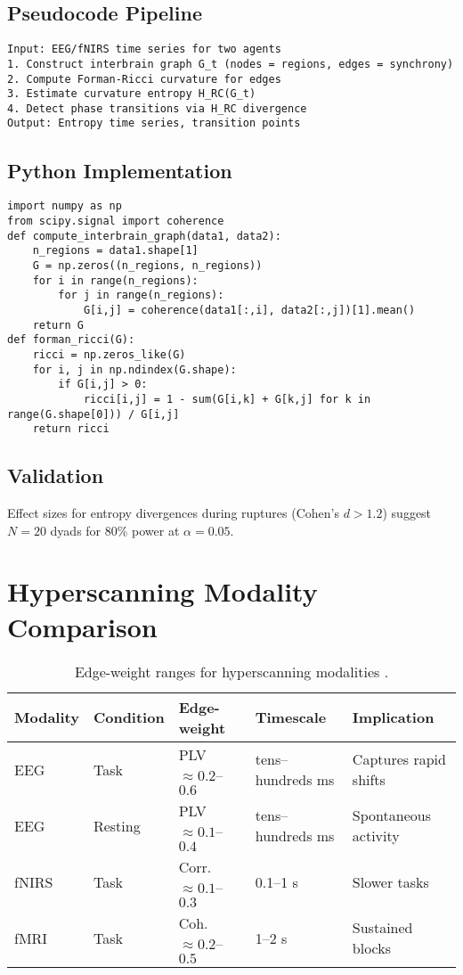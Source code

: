 \documentclass{article}
\theoremstyle{definition}
\begin{document}
\subsection{Pseudocode Pipeline}
\begin{verbatim}
Input: EEG/fNIRS time series for two agents
1. Construct interbrain graph G_t (nodes = regions, edges = synchrony)
2. Compute Forman-Ricci curvature for edges
3. Estimate curvature entropy H_RC(G_t)
4. Detect phase transitions via H_RC divergence
Output: Entropy time series, transition points
\end{verbatim}

\subsection{Python Implementation}
\begin{verbatim}
import numpy as np
from scipy.signal import coherence
def compute_interbrain_graph(data1, data2):
    n_regions = data1.shape[1]
    G = np.zeros((n_regions, n_regions))
    for i in range(n_regions):
        for j in range(n_regions):
            G[i,j] = coherence(data1[:,i], data2[:,j])[1].mean()
    return G
def forman_ricci(G):
    ricci = np.zeros_like(G)
    for i, j in np.ndindex(G.shape):
        if G[i,j] > 0:
            ricci[i,j] = 1 - sum(G[i,k] + G[k,j] for k in range(G.shape[0])) / G[i,j]
    return ricci
\end{verbatim}

\subsection{Validation}
Effect sizes for entropy divergences during ruptures (Cohen’s $d > 1.2$) suggest $N=20$ dyads for 80\% power at $\alpha=0.05$.

\section{Hyperscanning Modality Comparison}
\begin{table}[ht]
\centering
\caption{Edge-weight ranges for hyperscanning modalities \cite{hinrichs2025geometry}.}
\label{tab:modality-comparison}
\begin{tabularx}{\textwidth}{@{}p{1.5cm} p{1.8cm} p{2.5cm} p{2cm} X@{}}
\toprule
\textbf{Modality} & \textbf{Condition} & \textbf{Edge-weight} & \textbf{Timescale} & \textbf{Implication} \\
\midrule
EEG & Task & PLV $\approx 0.2$--$0.6$ & tens--hundreds ms & Captures rapid shifts \\
EEG & Resting & PLV $\approx 0.1$--$0.4$ & tens--hundreds ms & Spontaneous activity \\
fNIRS & Task & Corr. $\approx 0.1$--$0.3$ & 0.1--1 s & Slower tasks \\
fMRI & Task & Coh. $\approx 0.2$--$0.5$ & 1--2 s & Sustained blocks \\
\bottomrule
\end{tabularx}
\end{table}
\end{document}
